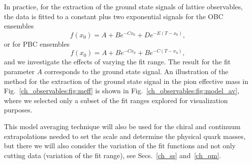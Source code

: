 In practice, for the extraction of the ground state signals of lattice observables, the data is fitted to a constant plus two exponential signals for the OBC ensembles
\begin{equation}
\label{ch_observables:eq:fit}
f(x_0)=A+Be^{-Cx_0}+De^{-E(T-x_0)},
\end{equation}
or for PBC ensembles
\begin{equation}
f(x_0)=A+Be^{-Cx_0}+Be^{-C(T-x_0)},
\end{equation}
and we investigate the effects of varying the fit range. The result for the fit parameter $A$ corresponds to the ground state signal. An illustration of the method for the extraction of the ground state signal in the pion effective mass in Fig.~\ref{ch_observables:fig:meff} is shown in Fig.~\ref{ch_observables:fig:model_av}, where we selected only a subset of the fit ranges explored for visualization purposes.

This model averaging technique will also be used for the chiral and continuum extrapolations needed to set the scale and determine the physical quark masses, but there we will also consider the variation of the fit functions and not only cutting data (variation of the fit range), see Secs.~\ref{ch_ss} and~\ref{ch_qm}.

